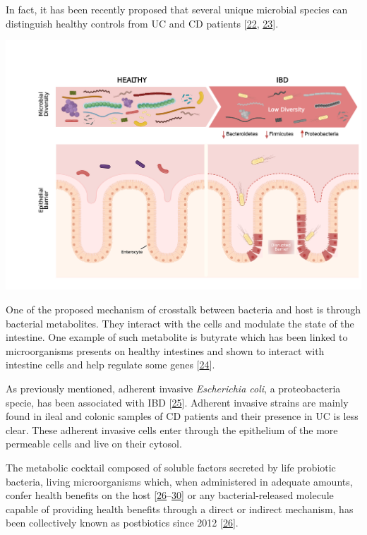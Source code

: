 \documentclass[
  a4paper,
]{book}
\let\origfigure\figure
\let\endorigfigure\endfigure
\renewenvironment{figure}[1][2] {
    \expandafter\origfigure\expandafter[!ht]
} {
    \endorigfigure
}
\begin{document}
In fact, it has been recently proposed that several unique microbial species can distinguish healthy controls from UC and CD patients {[}\protect\hyperlink{ref-sankarasubramanian2020}{22}, \protect\hyperlink{ref-lopez-siles2014}{23}{]}.

\begin{figure}
\includegraphics[width=1\linewidth]{images/tesis_AM_Figure2} \caption{The microbial composition in a healthy and IBD gut.}\label{fig:composition}
\end{figure}

One of the proposed mechanism of crosstalk between bacteria and host is through bacterial metabolites.
They interact with the cells and modulate the state of the intestine.
One example of such metabolite is butyrate which has been linked to microorganisms presents on healthy intestines and shown to interact with intestine cells and help regulate some genes {[}\protect\hyperlink{ref-ferrer-picuxf3n2020}{24}{]}.

As previously mentioned, adherent invasive \emph{Escherichia coli}, a proteobacteria specie, has been associated with IBD {[}\protect\hyperlink{ref-darfeuille-michaud1998}{25}{]}.
Adherent invasive strains are mainly found in ileal and colonic samples of CD patients and their presence in UC is less clear.
These adherent invasive cells enter through the epithelium of the more permeable cells and live on their cytosol.

The metabolic cocktail composed of soluble factors secreted by life probiotic bacteria, living microorganisms which, when administered in adequate amounts, confer health benefits on the host {[}\protect\hyperlink{ref-tsilingiri2012}{26}--\protect\hyperlink{ref-morelli2012}{30}{]} or any bacterial-released molecule capable of providing health benefits through a direct or indirect mechanism, has been collectively known as postbiotics since 2012 {[}\protect\hyperlink{ref-tsilingiri2012}{26}{]}.
\end{document}
